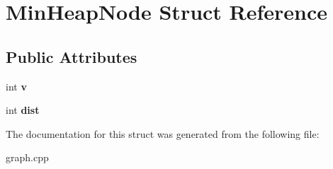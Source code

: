 \hypertarget{structMinHeapNode}{}\section{Min\+Heap\+Node Struct Reference}
\label{structMinHeapNode}
\subsection*{Public Attributes}
\begin{DoxyCompactItemize}
\item 
\mbox{\label{structMinHeapNode_ae8e924bbd85d4fc80f1f841bc7d46cdd}} 
int {\bfseries v}
\item 
\mbox{\label{structMinHeapNode_ab6e5caa74582a330e2106ae442bf0c5d}} 
int {\bfseries dist}
\end{DoxyCompactItemize}


The documentation for this struct was generated from the following file\+:\begin{DoxyCompactItemize}
\item 
graph.\+cpp\end{DoxyCompactItemize}
